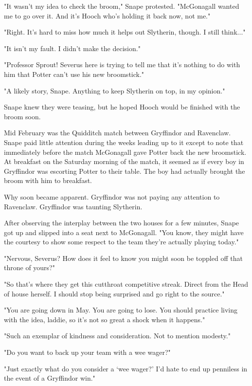 \documentclass[a4paper,11pt]{article}
\begin{document}
"It wasn't my idea to check the broom," Snape protested. "McGonagall wanted me to go over it. And it's Hooch who's holding it back now, not me."

"Right. It's hard to miss how much it helps out Slytherin, though. I still think..."

"It isn't my fault. I didn't make the decision."

"Professor Sprout! Severus here is trying to tell me that it's nothing to do with him that Potter can't use his new broomstick."

"A likely story, Snape. Anything to keep Slytherin on top, in my opinion."

Snape knew they were teasing, but he hoped Hooch would be finished with the broom soon.

Mid February was the Quidditch match between Gryffindor and Ravenclaw. Snape paid little attention during the weeks leading up to it except to note that immediately before the match McGonagall gave Potter back the new broomstick. At breakfast on the Saturday morning of the match, it seemed as if every boy in Gryffindor was escorting Potter to their table. The boy had actually brought the broom with him to breakfast.

Why soon became apparent. Gryffindor was not paying any attention to Ravenclaw. Gryffindor was taunting Slytherin.

After observing the interplay between the two houses for a few minutes, Snape got up and slipped into a seat next to McGonagall. "You know, they might have the courtesy to show some respect to the team they're actually playing today."

"Nervous, Severus? How does it feel to know you might soon be toppled off that throne of yours?"

"So that's where they get this cutthroat competitive streak. Direct from the Head of house herself. I should stop being surprised and go right to the source."

"You are going down in May. You are going to lose. You should practice living with the idea, laddie, so it's not so great a shock when it happens."

"Such an exemplar of kindness and consideration. Not to mention modesty."

"Do you want to back up your team with a wee wager?"

"Just exactly what do you consider a `wee wager?' I'd hate to end up penniless in the event of a Gryffindor win."
\end{document}
